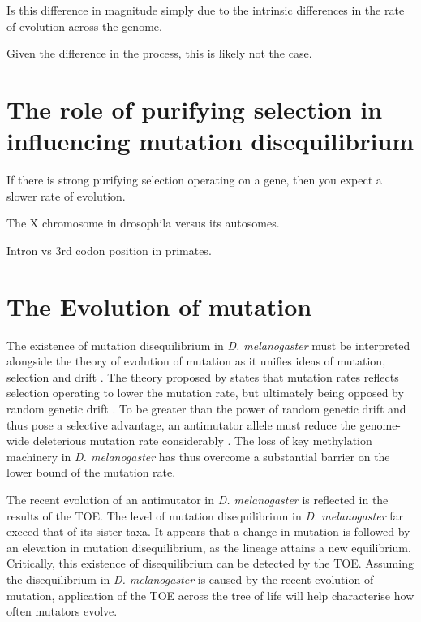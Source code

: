 Is this difference in magnitude simply due to the intrinsic differences in the rate of evolution across the genome. 

Given the difference in the process, this is likely not the case. 


\section{The role of purifying selection in influencing mutation disequilibrium}



If there is strong purifying selection operating on a gene, then you expect a slower rate of evolution. 


The X chromosome in drosophila versus its autosomes. 

Intron vs 3rd codon position in primates. 

\section{The Evolution of mutation}

The existence of mutation disequilibrium in \textit{D. melanogaster} must be interpreted alongside the theory of evolution of mutation as it unifies ideas of mutation, selection and drift \citep{Lynch2008TheEvolution., Lynch2010EvolutionRate}. The theory proposed by \cite{Lynch2008TheEvolution.} states that mutation rates reflects selection operating to lower the mutation rate, but ultimately being opposed by random genetic drift \citep{Lynch2010EvolutionRate}. To be greater than the power of random genetic drift and thus pose a selective advantage, an antimutator allele must reduce the genome-wide deleterious mutation rate considerably \citep{Lynch2008TheEvolution., Lynch2010EvolutionRate}. The loss of key methylation machinery in \textit{D. melanogaster} has thus overcome a substantial barrier on the lower bound of the mutation rate. 

The recent evolution of an antimutator in \textit{D. melanogaster} is reflected in the results of the TOE. The level of mutation disequilibrium in \textit{D. melanogaster} far exceed that of its sister taxa. It appears that a change in mutation is followed by an elevation in mutation disequilibrium, as the lineage attains a new equilibrium. Critically, this existence of disequilibrium can be detected by the TOE. Assuming the disequilibrium in \textit{D. melanogaster} is caused by the recent evolution of mutation, application of the TOE across the tree of life will help characterise how often mutators evolve. 



